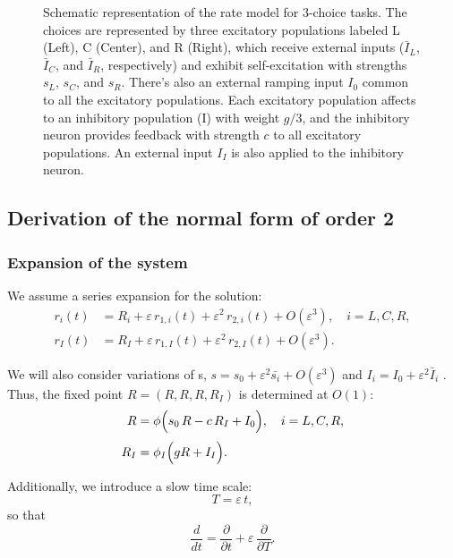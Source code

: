 \documentclass[ENG]{fancynotes}
\begin{document}
\begin{figure}[H]
\begin{tikzpicture}[>=Stealth,
  neuron/.style={draw, circle, minimum size=2.0cm, inner sep=4pt, font=\Large},
  arrowlabel/.style={draw=none, fill=none, font=\Large}]
\end{tikzpicture}
\caption{Schematic representation of the rate model for 3-choice tasks. The choices are represented by three excitatory populations labeled L (Left), C (Center), and R (Right), which receive external inputs ($\bar{I}_L$, $\bar{I}_C$, and $\bar{I}_R$, respectively) and exhibit self-excitation with strengths $s_L$, $s_C$, and $s_R$. There's also an external ramping input $I_0$ common to all the excitatory populations. Each excitatory population affects to an inhibitory population (I) with weight $g/3$, and the inhibitory neuron provides feedback with strength $c$ to all excitatory populations. An external input $I_I$ is also applied to the inhibitory neuron.}
\label{fig:model-rates}
\end{figure}
\newpage


\subsection{Derivation of the normal form of order 2}
\subsubsection{Expansion of the system}
We assume a series expansion for the solution:
\begin{align}
  r_i(t) &= R_i + \varepsilon\,r_{1,i}(t) + \varepsilon^2\,r_{2,i}(t) + O(\varepsilon^3), \quad i=L,C,R, \label{eq:exp_ex}\\[1mm]
  r_I(t) &= R_I + \varepsilon\,r_{1,I}(t) + \varepsilon^2\,r_{2,I}(t) + O(\varepsilon^3). \label{eq:exp_inh}
\end{align}


We will also consider variations of s,  $s = s_0 +\varepsilon^2 \bar{s_i} + O(\varepsilon^3)$ and $I_i = I_0 + \varepsilon^2\bar{I}_i$ . 
Thus, the fixed point \(R=(R,R,R,R_I)\) is determined at \(O(1)\):
\begin{align}
  R &= \phi\Bigl(s_0\,R - c\,R_I + I_0  \Bigr), \quad i=L,C,R, \label{eq:fixed_ex}\\[1mm]
  R_I &= \phi_I\Bigl({g}R+I_I\Bigr). \label{eq:fixed_inh}
\end{align}

Additionally, we introduce a slow time scale:
\[
T = \varepsilon\,t,
\]
so that
\[
\frac{d}{dt} = \frac{\partial}{\partial t} + \varepsilon\,\frac{\partial}{\partial T}.
\]
\end{document}
